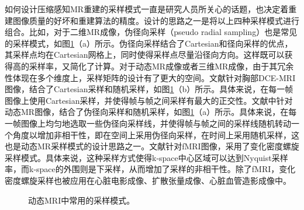 如何设计压缩感知MR重建的采样模式一直是研究人员所关心的话题，也决定着重建图像质量的好坏和重建算法的精度。设计的思路之一是将以上四种采样模式进行组合。比如，对于二维MR成像，伪径向采样\cite{Sajan2011Accelerated}（pseudo radial sampling）也是常见的采样模式，如图\ref{fig:maskdynamic}（a）所示。伪径向采样结合了Cartesian和径向采样的优点，其采样点均在Cartesian网格上，同时使得采样点尽量沿径向方向。这样既可以获得高的采样率，又简化了计算。对于动态MR成像或者三维MR成像，由于其冗余性体现在多个维度上，采样矩阵的设计有了更大的空间。文献\cite{smith2012}针对胸部DCE-MRI图像，结合了Cartesian采样和随机采样，如图\ref{fig:maskdynamic}（b）所示。具体来说，在每一帧图像上使用Cartesian采样，并使得帧与帧之间采样有最大的正交性。文献\cite{Sajan2011Accelerated}中针对动态MR图像，结合了伪径向采样和随机采样，如图\ref{fig:maskdynamic}（a）所示。具体来说，在每一帧图像上均匀地选取一些伪径向采样线，并使得帧与帧之间的采样线随机转动一个角度以增加非相干性，即在空间上采用伪径向采样，在时间上采用随机采样，这也是动态MR采样模式的设计思路之一。文献\cite{holland2013compressed}针对fMRI图像，采用了变化密度螺旋采样模式。具体来说，这种采样方式使得k-space中心区域可以达到Nyquist采样率，而k-space的外围则是下采样，从而增加了采样的非相干性。除了fMRI，变化密度螺旋采样也被应用在心脏电影成像\cite{kressler2007three}、扩散张量成像\cite{karampinos2009high}、心脏血管造影成像\cite{santos2006single}中。

\begin{figure}[htbp]
\centering
{}
\caption{动态MRI中常用的采样模式。}
\label{fig:maskdynamic}
\end{figure}

